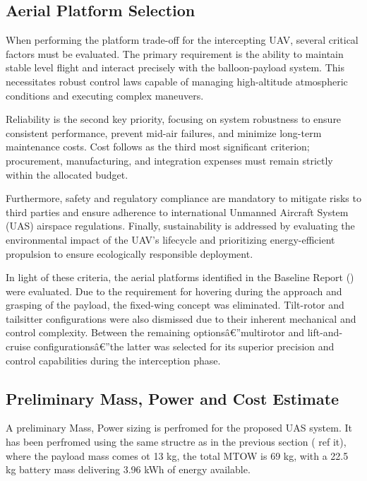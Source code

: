 \subsection{Aerial Platform Selection}

When performing the platform trade-off for the intercepting UAV, several critical factors must be evaluated. The primary requirement is the ability to maintain stable level flight and interact precisely with the balloon-payload system. This necessitates robust control laws capable of managing high-altitude atmospheric conditions and executing complex maneuvers.

Reliability is the second key priority, focusing on system robustness to ensure consistent performance, prevent mid-air failures, and minimize long-term maintenance costs. Cost follows as the third most significant criterion; procurement, manufacturing, and integration expenses must remain strictly within the allocated budget.

Furthermore, safety and regulatory compliance are mandatory to mitigate risks to third parties and ensure adherence to international Unmanned Aircraft System (UAS) airspace regulations. Finally, sustainability is addressed by evaluating the environmental impact of the UAV's lifecycle and prioritizing energy-efficient propulsion to ensure ecologically responsible deployment.

In light of these criteria, the aerial platforms identified in the Baseline Report () were evaluated. Due to the requirement for hovering during the approach and grasping of the payload, the fixed-wing concept was eliminated. Tilt-rotor and tailsitter configurations were also dismissed due to their inherent mechanical and control complexity. Between the remaining optionsâ€”multirotor and lift-and-cruise configurationsâ€”the latter was selected for its superior precision and control capabilities during the interception phase.

\subsection{Preliminary Mass, Power and Cost Estimate}

A preliminary Mass, Power sizing is perfromed for the proposed UAS system.  It has been perfromed using the same structre as in the previous section ( ref it), where the payload mass comes ot 13 kg, the total MTOW is 69 kg, with a 22.5 kg battery mass delivering 3.96 kWh of energy available. 

